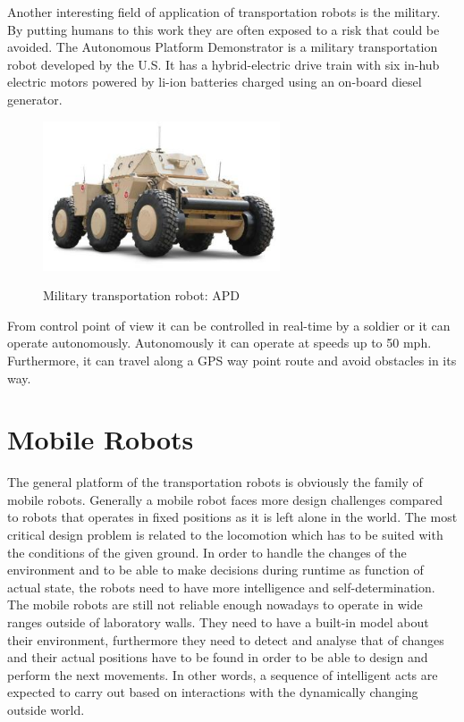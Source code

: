 \documentclass[12pt,english]{article}
\begin{document}
Another interesting field of application of transportation robots is the military. By putting humans to this work they are often exposed to a risk that could be avoided. The Autonomous Platform Demonstrator is a military transportation robot developed by the U.S. It has a hybrid-electric drive train with six in-hub electric motors powered by li-ion batteries charged using an on-board diesel generator. 

\begin{figure}[h]
	\centering
	\includegraphics[width=7cm]{figures/apd.jpg}
	\label{bmw}
	\caption{Military transportation robot: APD}
\end{figure}

From control point of view it can be controlled in real-time by a soldier or it can operate autonomously. Autonomously it can operate at speeds up to 50 mph. Furthermore, it can travel along a GPS way point route and avoid obstacles in its way. \cite{apd}






\newpage

\section{Mobile Robots}
The general platform of the transportation robots is obviously the family of mobile robots. Generally a mobile robot faces more design challenges compared to robots that operates in fixed positions as it is left alone in the world. The most critical design problem is related to the locomotion which has to be suited with the conditions of the given ground. In order to handle the changes of the environment and to be able to make decisions during runtime as function of actual state, the robots need to have more intelligence and self-determination. The mobile robots are still not reliable enough nowadays to operate in wide ranges outside of laboratory walls. They need to have a built-in model about their environment, furthermore they need to detect and analyse that of changes and their actual positions have to be found in order to be able to design and perform the next movements. In other words, a sequence of intelligent acts are expected to carry out based on interactions with the dynamically changing outside world.
\end{document}
